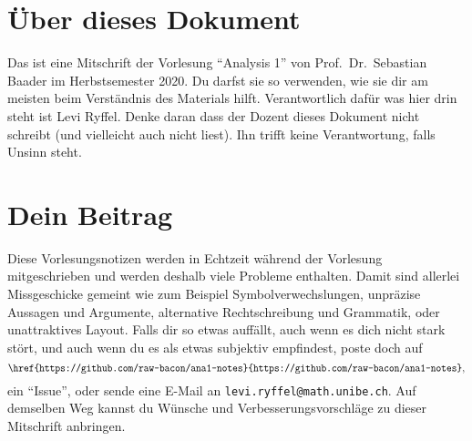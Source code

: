 \documentclass[../main.tex]{subfiles}
\begin{document}
\section*{Über dieses Dokument}
Das ist eine Mitschrift
der Vorlesung ``Analysis 1''
von Prof.\ Dr.\ Sebastian Baader
im Herbstsemester 2020.
Du darfst sie so verwenden,
wie sie dir am meisten
beim Verständnis des Materials
hilft.
Verantwortlich dafür was
hier drin steht ist Levi Ryffel.
Denke daran dass der Dozent dieses Dokument
nicht schreibt (und vielleicht auch nicht liest).
Ihn trifft keine Verantwortung, falls
Unsinn steht.

\section*{Dein Beitrag}
Diese Vorlesungsnotizen werden in Echtzeit während der Vorlesung mitgeschrieben
und werden deshalb viele Probleme enthalten.
Damit sind allerlei Missgeschicke
gemeint wie zum Beispiel
Symbolverwechslungen, unpräzise Aussagen und Argumente,
alternative Rechtschreibung und Grammatik,
oder unattraktives Layout.
Falls dir so etwas auffällt,
auch wenn es dich nicht stark stört,
und auch wenn du es
als etwas subjektiv empfindest,
poste doch auf
\[
\texttt{\href{https://github.com/raw-bacon/ana1-notes}{https://github.com/raw-bacon/ana1-notes}},
\]
ein ``Issue'', oder sende
eine E-Mail an \texttt{levi.ryffel@math.unibe.ch}.
Auf demselben Weg kannst du Wünsche
und Verbesserungsvorschläge
zu dieser Mitschrift
anbringen.
\end{document}
